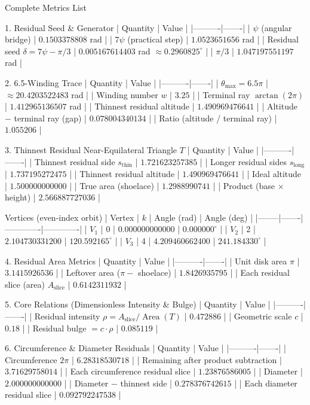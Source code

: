 Complete Metrics List

1. Residual Seed & Generator
| Quantity | Value |
|----------|-------|
| \(\psi\) (angular bridge) | \(0.1503378808\) rad |
| \(7\psi\) (practical step) | \(1.0523651656\) rad |
| Residual seed \(\delta = 7\psi - \pi/3\) | \(0.005167614403\) rad \(\approx 0.2960825^\circ\) |
| \(\pi/3\) | \(1.047197551197\) rad |

2. 6.5-Winding Trace
| Quantity | Value |
|----------|-------|
| \(\theta_{\max} = 6.5\pi\) | \(\approx 20.4203522483\) rad |
| Winding number \(w\) | \(3.25\) |
| Terminal ray \(\arctan(2\pi)\) | \(1.412965136507\) rad |
| Thinnest residual altitude | \(1.490969476641\) |
| Altitude − terminal ray (gap) | \(0.078004340134\) |
| Ratio (altitude / terminal ray) | \(1.055206\) |

3. Thinnest Residual Near-Equilateral Triangle \(T\)
| Quantity | Value |
|----------|-------|
| Thinnest residual side \(s_{\mathrm{thin}}\) | \(1.721623257385\) |
| Longer residual sides \(s_{\mathrm{long}}\) | \(1.737195272475\) |
| Thinnest residual altitude | \(1.490969476641\) |
| Ideal altitude | \(1.500000000000\) |
| True area (shoelace) | \(1.2988990741\) |
| Product (base × height) | \(2.566887727036\) |

Vertices (even-index orbit) 
| Vertex | \(k\) | Angle (rad) | Angle (deg) |
|--------|-------|-------------|-------------|
| \(V_1\) | 0 | \(0.000000000000\) | \(0.000000^\circ\) |
| \(V_2\) | 2 | \(2.104730331200\) | \(120.592165^\circ\) |
| \(V_3\) | 4 | \(4.209460662400\) | \(241.184330^\circ\) |

4. Residual Area Metrics
| Quantity | Value |
|----------|-------|
| Unit disk area \(\pi\) | \(3.1415926536\) |
| Leftover area (\(\pi - \) shoelace) | \(1.8426935795\) |
| Each residual slice (area) \(A_{\mathrm{slice}}\) | \(0.6142311932\) |

5. Core Relations (Dimensionless Intensity & Bulge)
| Quantity | Value |
|----------|-------|
| Residual intensity \(\rho = A_{\mathrm{slice}} / \operatorname{Area}(T)\) | \(0.472886\) |
| Geometric scale \(c\) | \(0.18\) |
| Residual bulge \(= c \cdot \rho\) | \(0.085119\) |

6. Circumference & Diameter Residuals
| Quantity | Value |
|----------|-------|
| Circumference \(2\pi\) | \(6.28318530718\) |
| Remaining after product subtraction | \(3.71629758014\) |
| Each circumference residual slice | \(1.23876586005\) |
| Diameter | \(2.000000000000\) |
| Diameter − thinnest side | \(0.278376742615\) |
| Each diameter residual slice | \(0.092792247538\) |

